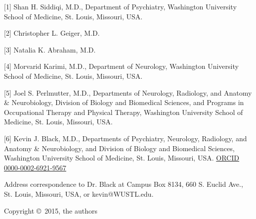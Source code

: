 [1] Shan H. Siddiqi, M.D., Department of Psychiatry, Washington University School of Medicine, St. Louis, Missouri, USA.

[2] Christopher L. Geiger, M.D.

[3] Natalia K. Abraham, M.D.

[4] Morvarid Karimi, M.D., Department of Neurology, Washington University School of Medicine, St. Louis, Missouri, USA.

[5] Joel S. Perlmutter, M.D., Departments of Neurology, Radiology, and Anatomy & Neurobiology, Division of Biology and Biomedical Sciences, and Programs in Occupational Therapy and Physical Therapy, Washington University School of Medicine, St. Louis, Missouri, USA.

[6] Kevin J. Black, M.D., Departments of Psychiatry, Neurology, Radiology, and Anatomy \& Neurobiology, and Division of Biology and Biomedical Sciences, Washington University School of Medicine, St. Louis, Missouri, USA.  \href{http://orcid.org/0000-0002-6921-9567}{ORCID 0000-0002-6921-9567}

Address correspondence to Dr. Black at Campus Box 8134, 660 S. Euclid Ave., St. Louis, Missouri, USA, or kevin@WUSTL.edu.

Copyright \copyright\, 2015, the authors
